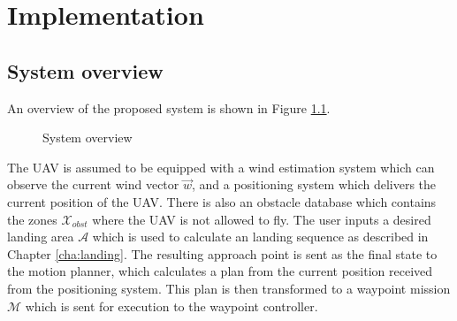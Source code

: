 \chapter{Implementation}\label{cha:implementation}
\section{System overview}
An overview of the proposed system is shown in Figure \ref{fig:sys_overview}.
\begin{figure}
    \begin{center}
    \end{center}
    \caption{System overview}
    \label{fig:sys_overview}
\end{figure}
The UAV is assumed to be equipped with a wind estimation system which can observe the current wind vector $\vec{w}$, and a positioning system which delivers the current position of the UAV. 
There is also an obstacle database which contains the zones $\mathcal{X}_{obst}$ where the UAV is not allowed to fly. The user inputs a desired landing area $\mathcal{A}$ which is 
used to calculate an landing sequence as described in Chapter \ref{cha:landing}. The resulting approach point is sent as the final state to the motion planner, which calculates a plan from the current 
position received from the positioning system. This plan is then transformed to a waypoint mission $\mathcal{M}$ which is sent for execution to the waypoint controller.
